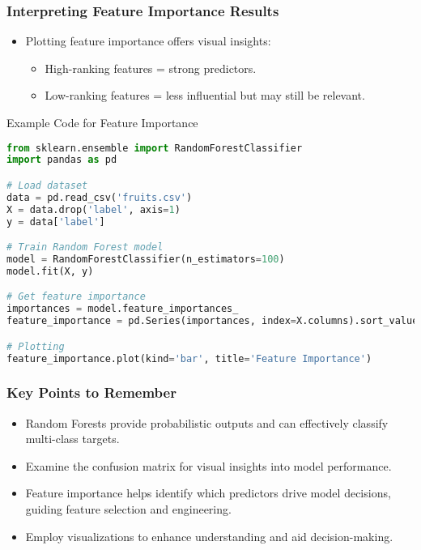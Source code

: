 \documentclass[aspectratio=169]{beamer}
\begin{document}
\begin{frame}
    \frametitle{Interpreting Feature Importance Results}
    \begin{itemize}
        \item Plotting feature importance offers visual insights:
            \begin{itemize}
                \item High-ranking features = strong predictors.
                \item Low-ranking features = less influential but may still be relevant.
            \end{itemize}
    \end{itemize}

    \begin{block}{Example Code for Feature Importance}
    \begin{lstlisting}[language=Python]
from sklearn.ensemble import RandomForestClassifier
import pandas as pd

# Load dataset
data = pd.read_csv('fruits.csv')
X = data.drop('label', axis=1)
y = data['label']

# Train Random Forest model
model = RandomForestClassifier(n_estimators=100)
model.fit(X, y)

# Get feature importance
importances = model.feature_importances_
feature_importance = pd.Series(importances, index=X.columns).sort_values(ascending=False)

# Plotting
feature_importance.plot(kind='bar', title='Feature Importance')
    \end{lstlisting}
    \end{block}
\end{frame}

\begin{frame}
    \frametitle{Key Points to Remember}
    \begin{itemize}
        \item Random Forests provide probabilistic outputs and can effectively classify multi-class targets.
        \item Examine the confusion matrix for visual insights into model performance.
        \item Feature importance helps identify which predictors drive model decisions, guiding feature selection and engineering.
        \item Employ visualizations to enhance understanding and aid decision-making.
    \end{itemize}
\end{frame}
\end{document}

